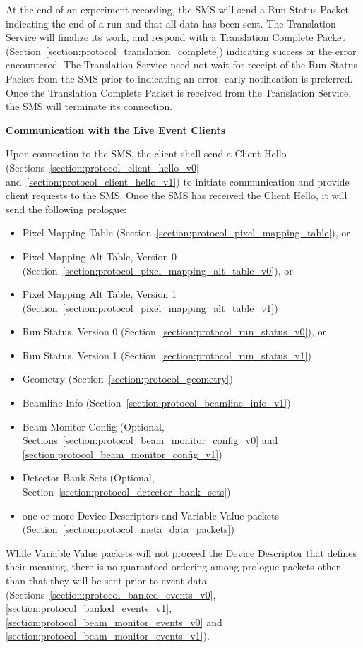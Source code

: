 At the end of an experiment recording, the SMS will send a Run Status Packet
indicating the end of a run and that all data has been sent. The Translation
Service will finalize its work, and respond with a Translation Complete Packet
(Section~\ref{section:protocol_translation_complete}) indicating success or the
error encountered.  The Translation Service need not wait for receipt of the
Run Status Packet from the SMS prior to indicating an error; early notification
is preferred.  Once the Translation Complete Packet is received from the
Translation Service, the SMS will terminate its connection.


{\large \bf Communication with the Live Event Clients}

Upon connection to the SMS, the client shall send a Client Hello
(Sections~\ref{section:protocol_client_hello_v0}
and~\ref{section:protocol_client_hello_v1}) to initiate communication
and provide client requests to the SMS. Once the SMS has received the Client
Hello, it will send the following prologue:
\begin{itemize}
\item Pixel Mapping Table (Section~\ref{section:protocol_pixel_mapping_table}), or
\item Pixel Mapping Alt Table, Version 0 (Section~\ref{section:protocol_pixel_mapping_alt_table_v0}), or
\item Pixel Mapping Alt Table, Version 1 (Section~\ref{section:protocol_pixel_mapping_alt_table_v1})
\item Run Status, Version 0 (Section~\ref{section:protocol_run_status_v0}), or
\item Run Status, Version 1 (Section~\ref{section:protocol_run_status_v1})
\item Geometry (Section~\ref{section:protocol_geometry})
\item Beamline Info (Section~\ref{section:protocol_beamline_info_v1})
\item Beam Monitor Config (Optional, Sections~\ref{section:protocol_beam_monitor_config_v0} and \ref{section:protocol_beam_monitor_config_v1})
\item Detector Bank Sets (Optional, Section~\ref{section:protocol_detector_bank_sets})
\item one or more Device Descriptors and Variable Value packets
(Section~\ref{section:protocol_meta_data_packets})
\end{itemize}
While Variable Value packets will not proceed the Device Descriptor that
defines their meaning, there is no guaranteed ordering among prologue
packets other than that they will be sent prior to event data
(Sections~\ref{section:protocol_banked_events_v0},
\ref{section:protocol_banked_events_v1},
\ref{section:protocol_beam_monitor_events_v0}
and \ref{section:protocol_beam_monitor_events_v1}).


